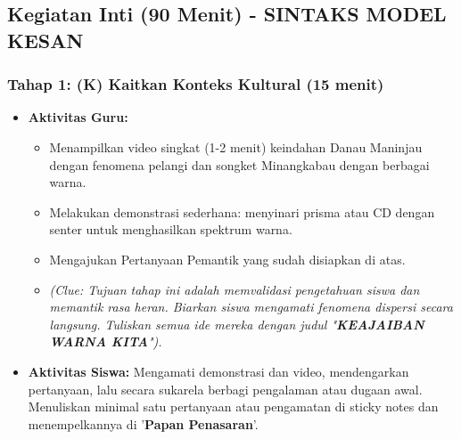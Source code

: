 \documentclass[12pt,a4paper]{article}
\begin{document}
\subsection{Kegiatan Inti (90 Menit) - SINTAKS MODEL KESAN}

\subsubsection{Tahap 1: (K) Kaitkan Konteks Kultural (15 menit)}
\begin{itemize}
\item \textbf{Aktivitas Guru:}
    \begin{itemize}
    \item Menampilkan video singkat (1-2 menit) keindahan Danau Maninjau dengan fenomena pelangi dan songket Minangkabau dengan berbagai warna.
    \item Melakukan demonstrasi sederhana: menyinari prisma atau CD dengan senter untuk menghasilkan spektrum warna.
    \item Mengajukan Pertanyaan Pemantik yang sudah disiapkan di atas.
    \item \textit{(Clue: Tujuan tahap ini adalah memvalidasi pengetahuan siswa dan memantik rasa heran. Biarkan siswa mengamati fenomena dispersi secara langsung. Tuliskan semua ide mereka dengan judul "\textbf{KEAJAIBAN WARNA KITA}").}
    \end{itemize}
\item \textbf{Aktivitas Siswa:} Mengamati demonstrasi dan video, mendengarkan pertanyaan, lalu secara sukarela berbagi pengalaman atau dugaan awal. Menuliskan minimal satu pertanyaan atau pengamatan di sticky notes dan menempelkannya di '\textbf{Papan Penasaran}'.
\end{itemize}
\end{document}
